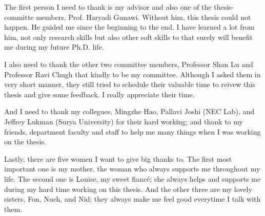 The first person I need to thank is my advisor and also one of the
thesis-committe members, Prof. Haryadi Gunawi. Without him, this thesis could
not happen. He guided me since the beginning to the end.  I have learned a lot
from him, not only research skills but also other soft skills to that surely will
benefit me during my future Ph.D. life. 

I also need to thank the other two committee members, Professor Shan Lu and
Professor Ravi Chugh that kindly to be my committee. Although I asked them in
very short manner, they still tried to schedule their valuable time to reivew
this thesis and give some feedback. I really appreciate their time.

And I need to thank my collegues, Mingzhe Hao, Pallavi Joshi (NEC Lab), and
Jeffrey Lukman (Surya University) for their hard working; and thank to my
friends, department faculty and staff to help me many things when I was working
on the thesis.

Lastly, there are five women I want to give big thanks to. The first most
important one is my mother, the woman who always supports me throughout my life.
The second one is Louise, my sweet fianc\'e; she always helps and supports me
during my hard time working on this thesis. And the other three are my lovely
sisters, Fon, Nuch, and Nid; they always make me feel good everytime I talk with
them.

